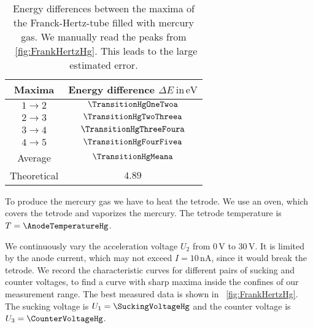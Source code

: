 \documentclass[a4paper,10pt,twocolumn]{article}
\newcommand{\volt}{\, \mathrm{V}}
\newcommand{\eV}{\, \mathrm{eV}}
\newcommand{\HgLevelA}{6^3\mathrm{P}_1}
\newcommand{\TheoreticalTransitionHga}{4.89}
\begin{document}

    \begin{table}[httb]
        \centering
        \begin{tabular}{c c}
            \hline \hline 
            Maxima & Energy difference $\Delta E \ \mathrm{in} \eV$ \\
            \hline
            $1 \rightarrow 2$ & $\TransitionHgOneTwoa$ \\
            $2 \rightarrow 3$ & $\TransitionHgTwoThreea$ \\
            $3 \rightarrow 4$ & $\TransitionHgThreeFoura$\\
            $4 \rightarrow 5$ & $\TransitionHgFourFivea$\\
            \hline
            Average & $\TransitionHgMeana$\\
            Theoretical & $\TheoreticalTransitionHga$ \\
            \hline 
            \hline
        \end{tabular}
        \caption{Energy differences between the maxima of the Franck-Hertz-tube filled with mercury gas.
        We manually read the peaks from ~\autoref{fig:FrankHertzHg}.
        This leads to the large estimated error.
        }
        \label{tab:transitionHg}
    \end{table}
    
    To produce the mercury gas we have to heat the tetrode.
    We use an oven, which covers the tetrode and vaporizes the mercury.
    The tetrode temperature is $T = \AnodeTemperatureHg$.
    
    We continuously vary the acceleration voltage $U_2$ from $0\volt$ to $30\volt$.
    It is limited by the anode current, which 
    may not exceed $I = 10 \, \mathrm{nA}$, since it would break the tetrode.
    We record the characteristic curves for different pairs of sucking and counter voltages, to
    find a curve with sharp maxima inside the confines of our measurement range.
    The best measured data is shown in ~\autoref{fig:FrankHertzHg}.
    The sucking voltage is $U_1 = \SuckingVoltageHg$ and the counter voltage is $U_3 = \CounterVoltageHg$.
    
\end{document}
